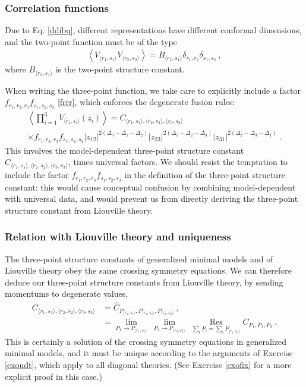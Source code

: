 \documentclass[12pt, a4paper, notitlepage, twoside]{report}
\numberwithin{equation}{section}
\theoremstyle{break}
\begin{document}
\subsubsection{Correlation functions}

Due to Eq. \eqref{ddibq}, different representations have different conformal dimensions, and the two-point function must be of the type 
\begin{align}
 \left\langle V_{\langle r_1,s_1 \rangle} V_{\langle r_2,s_2 \rangle} \right\rangle = B_{\langle r_1,s_1 \rangle} \delta_{r_1,r_2} \delta_{s_1,s_2}\ ,
\label{vvdd}
\end{align}
where $B_{\langle r_1,s_1\rangle}$ is the two-point structure constant.

When writing the three-point function, we take care to explicitly include a factor $f_{r_1,r_2,r_3} f_{s_1,s_2,s_3}$ \eqref{frrr}, which enforces the degenerate fusion rules:
\begin{multline}
 \left\langle \prod_{i=1}^3 V_{\langle r_i,s_i \rangle}(z_i) \right\rangle = C_{\langle r_1,s_1\rangle ,\langle r_2,s_2\rangle ,\langle r_3,s_3 \rangle}  
\\ \times 
f_{r_1,r_2,r_3} f_{s_1,s_2,s_3} |z_{12}|^{2(\Delta_3-\Delta_1-\Delta_2)} |z_{23}|^{2(\Delta_1-\Delta_2-\Delta_3)} |z_{31}|^{2(\Delta_2-\Delta_3-\Delta_1)}\ .
\end{multline}
This involves the model-dependent three-point structure constant $C_{\langle r_1,s_1\rangle ,\langle r_2,s_2\rangle ,\langle r_3,s_3 \rangle}$, times universal factors. We should resist the temptation to include the factor $f_{r_1,r_2,r_3} f_{s_1,s_2,s_3}$ in the definition of the three-point structure constant: this would cause conceptual confusion by combining model-dependent with universal data, and would prevent us from directly deriving the three-point structure constant from Liouville theory.


\subsubsection{Relation with Liouville theory and uniqueness}

The three-point structure constants of generalized minimal models and of Liouville theory obey the same crossing symmetry equations. We can therefore deduce our three-point structure constants from Liouville theory, by sending momentums to degenerate values, 
\begin{align}
 C_{\langle r_1,s_1\rangle ,\langle r_2,s_2\rangle ,\langle r_3,s_3 \rangle} 
 &= \hat{C}_{P_{\langle r_1,s_1 \rangle}, P_{\langle r_2,s_2 \rangle} ,P_{\langle r_3,s_3 \rangle} } \ ,
 \label{chc}
 \\
& = \underset{P_1\to P_{\langle r_1,s_1 \rangle}}{\lim}\ 
\underset{P_2\to P_{\langle r_2,s_2 \rangle}}{\lim}\ 
\underset{\sum_i P_i = \sum_i P_{\langle r_i,s_i \rangle} }{\operatorname{ Res}} C_{P_1,P_2,P_3}\ .
\label{clc}
\end{align}
This is certainly a solution of the crossing symmetry equations in generalized minimal models, 
and it must be unique according to the arguments of Exercise \ref{exoudt}, which apply to all diagonal theories. 
(See Exercise \ref{exofix} for a more explicit proof in this case.) 
\end{document}

